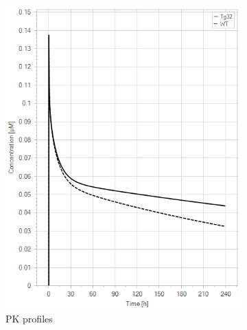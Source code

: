 \documentclass[fleqn,10pt]{physiome}
\begin{document}
\begin{figure}[htb]\centering
    \begin{subfigure}{0.49\textwidth}
        \includegraphics[width=\textwidth]{pl9.png}
        \caption{PK profiles}
        \label{fig:6a}
    \end{subfigure}
    \hfill
    \begin{subfigure}{0.49\textwidth}

\end{subfigure}
\end{figure}
\end{document}
